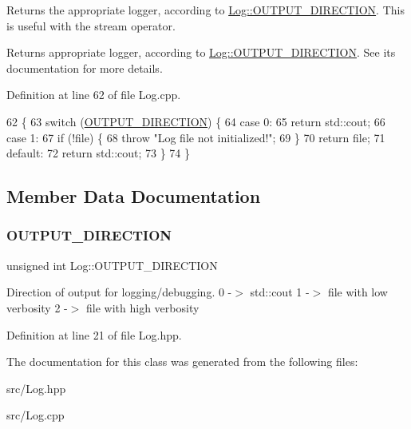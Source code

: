 Returns the appropriate logger, according to \mbox{\hyperlink{classLog_a8928d01e0edbf98838c642e04e12458e}{Log\+::\+O\+U\+T\+P\+U\+T\+\_\+\+D\+I\+R\+E\+C\+T\+I\+ON}}. This is useful with the stream operator. \begin{DoxyReturn}{Returns}
appropriate logger, according to \mbox{\hyperlink{classLog_a8928d01e0edbf98838c642e04e12458e}{Log\+::\+O\+U\+T\+P\+U\+T\+\_\+\+D\+I\+R\+E\+C\+T\+I\+ON}}. See its documentation for more details. 
\end{DoxyReturn}


Definition at line 62 of file Log.\+cpp.


\begin{DoxyCode}
62                         \{
63   \textcolor{keywordflow}{switch} (\mbox{\hyperlink{classLog_a8928d01e0edbf98838c642e04e12458e}{OUTPUT\_DIRECTION}}) \{
64   \textcolor{keywordflow}{case} 0:
65     \textcolor{keywordflow}{return} std::cout;
66   \textcolor{keywordflow}{case} 1:
67     \textcolor{keywordflow}{if} (!file) \{
68       \textcolor{keywordflow}{throw} \textcolor{stringliteral}{"Log file not initialized!"};
69     \}
70     \textcolor{keywordflow}{return} file;
71   \textcolor{keywordflow}{default}:
72     \textcolor{keywordflow}{return} std::cout;
73   \}
74 \}
\end{DoxyCode}


\subsection{Member Data Documentation}
\mbox{\label{classLog_a8928d01e0edbf98838c642e04e12458e}} 
\subsubsection{\texorpdfstring{O\+U\+T\+P\+U\+T\+\_\+\+D\+I\+R\+E\+C\+T\+I\+ON}{OUTPUT\_DIRECTION}}
{\footnotesize\ttfamily unsigned int Log\+::\+O\+U\+T\+P\+U\+T\+\_\+\+D\+I\+R\+E\+C\+T\+I\+ON\hspace{0.3cm}{\ttfamily [static]}}

Direction of output for logging/debugging. 0 -\/$>$ std\+::cout 1 -\/$>$ file with low verbosity 2 -\/$>$ file with high verbosity 

Definition at line 21 of file Log.\+hpp.



The documentation for this class was generated from the following files\+:\begin{DoxyCompactItemize}
\item 
src/Log.\+hpp\item 
src/Log.\+cpp\end{DoxyCompactItemize}
